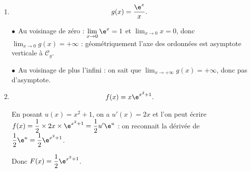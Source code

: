 \begin{enumerate}[resume]
On a quel que soit le naturel $n$, \: $b_{n+1} - b_n = \ln \left(\dfrac{2}{\left(b_n \right)^2 + 3}\right)$.

Or quel que soit le réel $b_n$, \: $b_n^2 \geqslant 0$, donc $\left(b_n\right)^2 + 3 \geqslant 3 > 2$, donc $\dfrac{2}{\left(b_n \right)^2 + 3} < 1$ et enfin $\ln \left(\dfrac{2}{\left(b_n \right)^2 + 3}\right) < 0$.

Conclusion : $b_{n+1} - b_n < 0$ montre que la suite $\left(b_n\right)$ est décroissante.

\item 

\[g(x) = \dfrac{\e^x}{x}.\]













$\bullet~~$Au voisinage de zéro : $\displaystyle\lim_{x \to 0} \e^x = 1$ et $\displaystyle\lim_{x \to 0}x  = 0$, donc $\displaystyle\lim_{x \to 0} g(x) = +\infty$ : géométriquement l'axe des ordonnées est asymptote verticale à $\mathcal{C}_g$.

$\bullet~~$Au voisinage de plus l'infini : on sait que $\displaystyle\lim_{x \to + \infty} g(x) = + \infty$, donc pas d'asymptote.

\item 

\[f(x) = x\e^{x^2+1}.\]









En posant $u(x) = x^2 + 1$, on a $u'(x) = 2x$ et l'on peut écrire $f(x) = \dfrac12 \times 2x \times \e^{x^2+1} = \dfrac12 u'\e^u$ : on reconnait la dérivée de $\dfrac12\e^u = \dfrac12\e^{x^2 + 1}$.

Donc $F(x) = \dfrac12\e^{x^2+1}$.
\end{enumerate}
